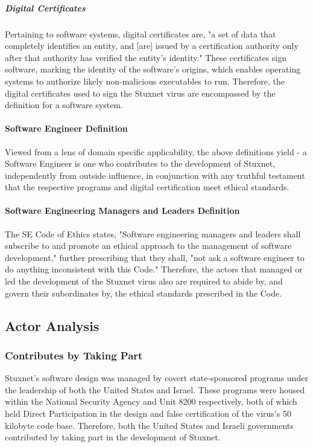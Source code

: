 \documentclass[12pt]{article}
\begin{document}
\begin{multicols}{2}
\subparagraph{Digital Certificates}
Pertaining to software systems, digital certificates are, "a set of data that completely identifies an entity, and [are] issued by a certification authority only after that authority has verified the entity's identity."\cite{digitalCertificateDefintion} These certificates sign software, marking the identity of the software's origins, which enables operating systems to authorize likely non-malicious executables to run. Therefore, the digital certificates used to sign the Stuxnet virus are encompassed by the definition for a software system.

\paragraph{Software Engineer Definition}

Viewed from a lens of domain specific applicability, the above definitions yield - a Software Engineer is one who contributes to the development of Stuxnet, independently from outside influence, in conjunction with any truthful testament that the respective programs and digital certification meet ethical standards.

\paragraph{Software Engineering Managers and Leaders Definition}

The SE Code of Ethics states, "Software engineering managers and leaders shall subscribe to and promote an ethical approach to the management of software development," further prescribing that they shall, "not ask a software engineer to do anything inconsistent with this Code."\cite{softwareEngineeringCodeOfEthics} Therefore, the actors that managed or led the development of the Stuxnet virus also are required to abide by, and govern their subordinates by, the ethical standards prescribed in the Code.


\subsection{Actor Analysis}

\subsubsection{Contributes by Taking Part}

Stuxnet's software design was managed by covert state-sponsored programs under the leadership of both the United States and Israel. These programs were housed within the National Security Agency and Unit 8200 respectively, both of which held Direct Participation in the design and false certification of the virus's 50 kilobyte code base.\cite{NationalSecurityAgencyAndUnit8200}\cite{w32.stuxnetDossier} Therefore, both the United States and Israeli governments contributed by taking part in the development of Stuxnet.


\end{multicols}
\end{document}
